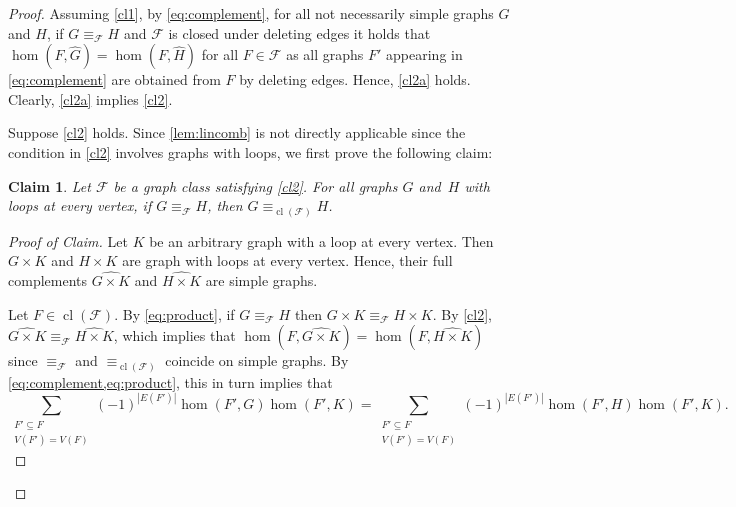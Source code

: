 \documentclass[3p,final]{elsarticle}
\DeclareMathOperator{\cl}{cl}
\newtheorem{claim}{Claim}[theorem]
\newenvironment{claimproof}[1][Proof of Claim]{\begin{proof}[#1] \renewcommand{\qedsymbol}{$\lrcorner$}}{ \end{proof}}
\begin{document}
	\begin{proof}Assuming \ref{cl1}, by \cref{eq:complement}, for all not necessarily simple graphs $G$ and $H$, if $G \equiv_{\mathcal{F}} H$ and $\mathcal{F}$ is closed under deleting edges it holds that $\hom(F, \widehat{G}) = \hom(F, \widehat{H})$ for all $F \in \mathcal{F}$ as all graphs $F'$ appearing in \cref{eq:complement} are obtained from $F$ by deleting edges. 
		Hence, \ref{cl2a} holds.
		Clearly, \ref{cl2a} implies \ref{cl2}.
		
		Suppose \ref{cl2} holds.
Since \cref{lem:lincomb} is not directly applicable since the condition in \ref{cl2} involves graphs with loops, we first prove the following claim:
		
		\begin{claim} \label{cl:full-complement}
			Let $\mathcal{F}$ be a graph class satisfying \ref{cl2}.
			For all graphs $G$ and~$H$ with loops at every vertex, if $G \equiv_{\mathcal{F}} H$, then $G \equiv_{\cl(\mathcal{F})} H$.
		\end{claim}
		\begin{claimproof}
			Let $K$ be an arbitrary graph with a loop at every vertex. Then
			$G \times K$ and $H \times K$ are graph with loops at every vertex.
			Hence, their full complements $\widehat{G \times K}$ and $\widehat{H \times K}$ are simple graphs.
			
			Let $F \in \cl(\mathcal{F})$.
			By \cref{eq:product}, if $G \equiv_{\mathcal{F}} H$ then 
			$G \times K \equiv_{\mathcal{F}} H \times K$.
			By \ref{cl2}, $\widehat{G \times K} \equiv_{\mathcal{F}} \widehat{H \times K}$, which implies that $\hom(F, \widehat{G \times K}) = \hom(F, \widehat{H \times K})$ since $\equiv_{\mathcal{F}}$ and $\equiv_{\cl(\mathcal{F})}$ coincide on simple graphs.
			By \cref{eq:complement,eq:product}, this in turn implies that
			\begin{equation} \label{eq:full-complement}
				\sum_{\substack{F' \subseteq F \\ V(F') = V(F)}} (-1)^{|E(F')|} \hom(F', G)\hom(F', K)  = \sum_{\substack{F' \subseteq F \\ V(F') = V(F)}} (-1)^{|E(F')|} \hom(F', H)\hom(F', K).
			\end{equation}



\end{claimproof}
\end{proof}
\end{document}
